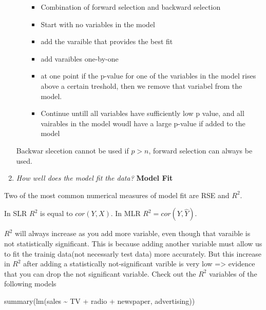 \documentclass[
  letterpaper,
  DIV=11,
  numbers=noendperiod]{scrreprt}
\newenvironment{Shaded}{\begin{snugshade}}{\end{snugshade}}
\newcommand{\FunctionTok}[1]{\textcolor[rgb]{0.02,0.16,0.49}{#1}}
\newcommand{\NormalTok}[1]{\textcolor[rgb]{0.33,0.33,0.33}{#1}}
\newcommand{\SpecialCharTok}[1]{\textcolor[rgb]{0.00,0.46,0.62}{#1}}
\providecommand{\tightlist}{%
  \setlength{\itemsep}{0pt}\setlength{\parskip}{0pt}}\usepackage{longtable,booktabs,array}
\begin{document}
\begin{enumerate}
\begin{itemize}
    \begin{itemize}
    \tightlist
    \item
      Combination of forward selection and backward selection
    \item
      Start with no variables in the model
    \item
      add the varaible that provides the best fit
    \item
      add varaibles one-by-one
    \item
      at one point if the p-value for one of the variables in the model
      rises above a certain treshold, then we remove that variabel from
      the model.
    \item
      Continue untill all variables have sufficiently low p value, and
      all vairables in the model woudl have a large p-value if added to
      the model
    \end{itemize}
  \end{itemize}

  Backwar slecetion cannot be used if \(p>n\), forward selection can
  always be used.
\item
  \emph{How well does the model fit the data?} \textbf{Model Fit}
\end{enumerate}

Two of the most common numerical measures of model fit are RSE and
\(R^2\).

In SLR \(R^2\) is equal to \(cor(Y,X)\). In MLR
\(R^2 = cor(Y,\hat{Y})\).

\(R^2\) will always increase as you add more variable, even though that
varaible is not statistically significant. This is because adding
another variable must allow us to fit the trainig data(not necessarly
test data) more accurately. But this increase in \(R^2\) after adding a
statistically not-significant varible is very low =\textgreater{}
evidence that you can drop the not significant variable. Check out the
\(R^2\) variables of the following models

\begin{Shaded}
\begin{Highlighting}[]
\FunctionTok{summary}\NormalTok{(}\FunctionTok{lm}\NormalTok{(sales }\SpecialCharTok{\textasciitilde{}}\NormalTok{ TV }\SpecialCharTok{+}\NormalTok{ radio }\SpecialCharTok{+}\NormalTok{ newspaper, advertising))}
\end{Highlighting}
\end{Shaded}
\end{document}
